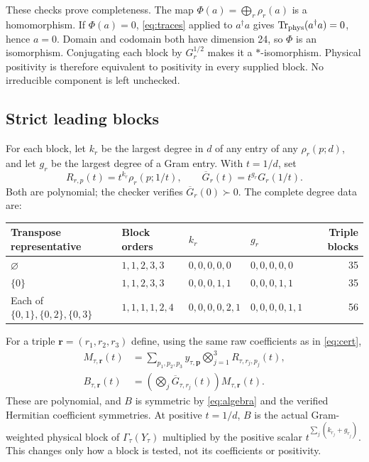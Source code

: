 \documentclass[10pt]{article}
\DeclareMathOperator{\Tr}{Tr}
\begin{document}
These checks prove completeness. The map
$\Phi(a)=\bigoplus_r\rho_r(a)$ is a homomorphism. If $\Phi(a)=0$,
\eqref{eq:traces} applied to $a^\dagger a$ gives
$\Tr_{\rm phys}(a^\dagger a)=0$, hence $a=0$. Domain and codomain both
have dimension 24, so $\Phi$ is an isomorphism. Conjugating each block by
$G_r^{1/2}$ makes it a $*$-isomorphism. Physical positivity is therefore
equivalent to positivity in every supplied block. No irreducible component
is left unchecked.

\subsection*{Strict leading blocks}
For each block, let $k_r$ be the largest degree in $d$ of any entry of
any $\rho_r(p;d)$, and let $g_r$ be the largest degree of a Gram entry.
With $t=1/d$, set
\[
 R_{r,p}(t)=t^{k_r}\rho_r(p;1/t),\qquad
 \overline G_r(t)=t^{g_r}G_r(1/t).
\]
Both are polynomial; the checker verifies
$\overline G_r(0)\succ0$. The complete degree data are:
\begin{center}\small
\begin{tabular}{@{}llllr@{}}\toprule
Transpose representative & Block orders & $k_r$ & $g_r$ & Triple blocks\\\midrule
$\varnothing$ & $1,1,2,3,3$ & $0,0,0,0,0$ & $0,0,0,0,0$ & 35\\
$\{0\}$ & $1,1,2,3,3$ & $0,0,0,1,1$ & $0,0,0,1,1$ & 35\\
Each of $\{0,1\},\{0,2\},\{0,3\}$ & $1,1,1,1,2,4$ & $0,0,0,0,2,1$ & $0,0,0,0,1,1$ & 56\\\bottomrule
\end{tabular}
\end{center}
For a triple $\mathbf r=(r_1,r_2,r_3)$ define, using the same raw coefficients
as in \eqref{eq:cert},
\begin{align}
 M_{\tau,\mathbf r}(t)
 &=\sum_{p_1,p_2,p_3}y_{\tau,\mathbf p}
                  \bigotimes_{j=1}^3R_{\tau,r_j,p_j}(t),\label{eq:normalized}\\
 B_{\tau,\mathbf r}(t)
 &=\left(\bigotimes_j\overline G_{\tau,r_j}(t)\right)
                         M_{\tau,\mathbf r}(t).
\end{align}
These are polynomial, and $B$ is symmetric by \eqref{eq:algebra} and
the verified Hermitian coefficient symmetries. At positive $t=1/d$, $B$
is the actual Gram-weighted physical block of $\Gamma_\tau(Y_\tau)$
multiplied by the positive scalar $t^{\sum_j(k_{r_j}+g_{r_j})}$.
This changes only how a block is tested, not its coefficients or positivity.
\end{document}
